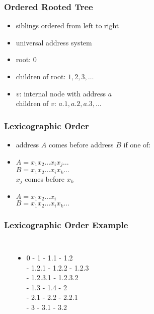 \documentclass[dvipsnames]{beamer}
\begin{document}
\begin{frame}
  \frametitle{Ordered Rooted Tree}

  \begin{itemize}
    \item siblings ordered from left to right

    \medskip
    \item \alert{universal address system}
    \smallskip
    \item root: $0$
    \item children of root: $1,2,3,\ldots$
    \item $v$: internal node with address $a$\\
      children of $v$: $a.1,a.2,a.3,\ldots$
  \end{itemize}
\end{frame}

\begin{frame}
  \frametitle{Lexicographic Order}

  \begin{itemize}
    \item address $A$ comes before address $B$ if one of:

    \medskip
    \item $A=x_1 x_2 \ldots x_i x_j \ldots$\\
      $B=x_1 x_2 \ldots x_i x_k \ldots$\\
      $x_j$ comes before $x_k$

    \pause
    \smallskip
    \item $A=x_1 x_2 \ldots x_i$\\
      $B=x_1 x_2 \ldots x_i x_k \ldots$
  \end{itemize}
\end{frame}

\begin{frame}
  \frametitle{Lexicographic Order Example}

  \begin{columns}
    \begin{center}
    \end{center}

    \begin{itemize}
      \item 0 - 1 - 1.1 - 1.2\\
        - 1.2.1 - 1.2.2 - 1.2.3\\
        - 1.2.3.1 - 1.2.3.2\\
        - 1.3 - 1.4 - 2\\
        - 2.1 - 2.2 - 2.2.1\\
        - 3 - 3.1 - 3.2
    \end{itemize}
  \end{columns}
\end{frame}
\end{document}
